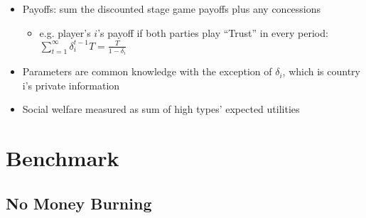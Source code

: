 \documentclass{beamer}
\newcommand{\de}{\delta}
\begin{document}

\begin{frame}
\begin{itemize}[<+->]
	\item Payoffs: sum the discounted stage game payoffs plus any concessions 
		\begin{itemize}
			\item e.g. player's $i$'s payoff if both parties play ``Trust'' in every period: $\sum_{t=1}^\infty \de_i^{t-1} T = \frac{T}{1-\de_i}$
		\end{itemize}
	\item Parameters are common knowledge with the exception of $\delta_i$, which is country i's private information
	\item Social welfare measured as sum of high types' expected utilities
\end{itemize}
\end{frame}


\section{Benchmark}
\subsection{No Money Burning}
\end{document}
